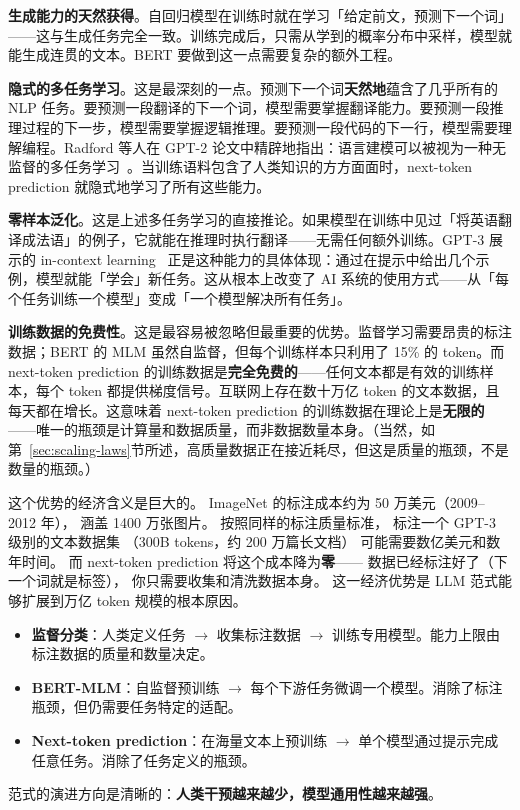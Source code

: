 \textbf{生成能力的天然获得}。自回归模型在训练时就在学习「给定前文，预测下一个词」——这与生成任务完全一致。训练完成后，只需从学到的概率分布中采样，模型就能生成连贯的文本。BERT 要做到这一点需要复杂的额外工程。

\textbf{隐式的多任务学习}。这是最深刻的一点。预测下一个词\textbf{天然地}蕴含了几乎所有的 NLP 任务。要预测一段翻译的下一个词，模型需要掌握翻译能力。要预测一段推理过程的下一步，模型需要掌握逻辑推理。要预测一段代码的下一行，模型需要理解编程。Radford 等人在 GPT-2 论文中精辟地指出：语言建模可以被视为一种无监督的多任务学习~\cite{radford2019gpt2}。当训练语料包含了人类知识的方方面面时，next-token prediction 就隐式地学习了所有这些能力。

\textbf{零样本泛化}。这是上述多任务学习的直接推论。如果模型在训练中见过「将英语翻译成法语」的例子，它就能在推理时执行翻译——无需任何额外训练。GPT-3 展示的 in-context learning~\cite{brown2020gpt3} 正是这种能力的具体体现：通过在提示中给出几个示例，模型就能「学会」新任务。这从根本上改变了 AI 系统的使用方式——从「每个任务训练一个模型」变成「一个模型解决所有任务」。

\textbf{训练数据的免费性}。这是最容易被忽略但最重要的优势。监督学习需要昂贵的标注数据；BERT 的 MLM 虽然自监督，但每个训练样本只利用了 15\% 的 token。而 next-token prediction 的训练数据是\textbf{完全免费的}——任何文本都是有效的训练样本，每个 token 都提供梯度信号。互联网上存在数十万亿 token 的文本数据，且每天都在增长。这意味着 next-token prediction 的训练数据在理论上是\textbf{无限的}——唯一的瓶颈是计算量和数据质量，而非数据数量本身。（当然，如第~\ref{sec:scaling-laws}节所述，高质量数据正在接近耗尽，但这是质量的瓶颈，不是数量的瓶颈。）

这个优势的经济含义是巨大的。
ImageNet 的标注成本约为 50 万美元（2009--2012 年），
涵盖 1400 万张图片。
按照同样的标注质量标准，
标注一个 GPT-3 级别的文本数据集
（300B tokens，约 200 万篇长文档）
可能需要数亿美元和数年时间。
而 next-token prediction 将这个成本降为\textbf{零}——
数据已经标注好了（下一个词就是标签），
你只需要收集和清洗数据本身。
这一经济优势是 LLM 范式能够扩展到万亿 token 规模的根本原因。

\begin{keybox}[两种范式的本质区别]
\begin{itemize}[noitemsep]
  \item \textbf{监督分类}：人类定义任务 $\to$ 收集标注数据 $\to$ 训练专用模型。能力上限由标注数据的质量和数量决定。
  \item \textbf{BERT-MLM}：自监督预训练 $\to$ 每个下游任务微调一个模型。消除了标注瓶颈，但仍需要任务特定的适配。
  \item \textbf{Next-token prediction}：在海量文本上预训练 $\to$ 单个模型通过提示完成任意任务。消除了任务定义的瓶颈。
\end{itemize}
范式的演进方向是清晰的：\textbf{人类干预越来越少，模型通用性越来越强}。
\end{keybox}

